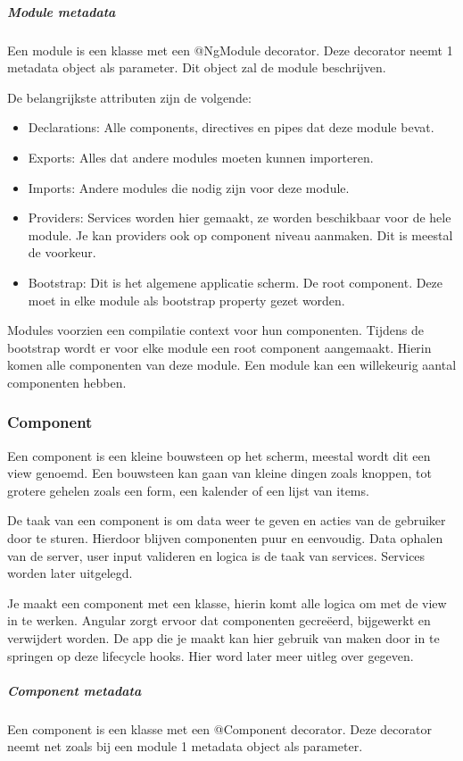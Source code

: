 \subparagraph{Module metadata}
Een module is een klasse met een @NgModule decorator. Deze decorator neemt 1 metadata object als parameter. Dit object zal de module beschrijven.

De belangrijkste attributen zijn de volgende:
\begin{itemize}
	\item Declarations: Alle components, directives en pipes dat deze module bevat.
	\item Exports: Alles dat andere modules moeten kunnen importeren.
	\item Imports: Andere modules die nodig zijn voor deze module.
	\item Providers: Services worden hier gemaakt, ze worden beschikbaar voor de hele module. Je kan providers ook op component niveau aanmaken. Dit is meestal de voorkeur.
	\item Bootstrap: Dit is het algemene applicatie scherm. De root component. Deze moet in elke module als bootstrap property gezet worden.
\end{itemize}

Modules voorzien een compilatie context voor hun componenten. Tijdens de bootstrap wordt er voor elke module een root component aangemaakt. Hierin komen alle componenten van deze module. Een module kan een willekeurig aantal componenten hebben.

\subsubsection{Component}
\label{sec:Angular_Component}
Een component is een kleine bouwsteen op het scherm, meestal wordt dit een view genoemd. Een bouwsteen kan gaan van kleine dingen zoals knoppen, tot grotere gehelen zoals een form, een kalender of een lijst van items.

De taak van een component is om data weer te geven en acties van de gebruiker door te sturen. Hierdoor blijven componenten puur en eenvoudig. Data ophalen van de server, user input valideren en logica is de taak van services. Services worden later uitgelegd.

Je maakt een component met een klasse, hierin komt alle logica om met de view in te werken. Angular zorgt ervoor dat componenten gecreëerd, bijgewerkt en verwijdert worden. De app die je maakt kan hier gebruik van maken door in te springen op deze lifecycle hooks. Hier word later meer uitleg over gegeven.

\subparagraph{Component metadata}
Een component is een klasse met een @Component decorator. Deze decorator neemt net zoals bij een module 1 metadata object als parameter.

